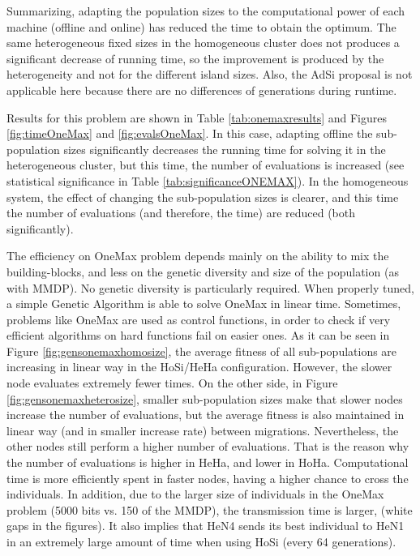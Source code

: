 \documentclass[final,1p,times]{elsarticle}
\begin{document}
Summarizing, adapting the population sizes to the
  computational power of each machine (offline and online) has reduced
  the time to obtain the optimum. The same heterogeneous fixed sizes
  in the homogeneous cluster does not produces a significant decrease
  of running time, so the improvement is produced by the heterogeneity
  and not for the different island sizes. Also, the AdSi proposal is
  not applicable here because there are no differences of generations
  during runtime.





Results for this problem are shown in Table \ref{tab:onemaxresults} and Figures  \ref{fig:timeOneMax} and \ref{fig:evalsOneMax}. In this case, adapting offline the sub-population sizes significantly decreases  the running time for solving it in the heterogeneous cluster, but this time, the number of evaluations is increased (see statistical significance in Table \ref{tab:significanceONEMAX}). In the homogeneous system, the effect of changing the sub-population sizes is clearer, and this time the number of evaluations (and therefore, the time) are reduced (both significantly). 

The efficiency on OneMax problem depends mainly on the ability to mix
the building-blocks, and less on the genetic diversity and size of the
population (as with MMDP). No genetic diversity is particularly
required. When properly tuned, a simple Genetic Algorithm is able to
solve OneMax in linear time. Sometimes, problems like OneMax are used
as control functions, in order to check if very efficient algorithms
on hard functions fail on easier ones. As it can be seen in Figure
\ref{fig:gensonemaxhomosize}, the average fitness of all sub-populations
are increasing in linear way in the HoSi/HeHa configuration. However,
the slower node evaluates extremely fewer times.  On the other
side, in Figure \ref{fig:gensonemaxheterosize}, smaller sub-population
sizes make that slower nodes increase the number of evaluations,
but the average fitness is also maintained in linear way (and in
smaller increase rate) between migrations. Nevertheless, the other
nodes still perform a higher number of evaluations. That is the
reason why the number of evaluations is higher in HeHa, and lower in
HoHa. Computational time is more efficiently spent in faster nodes,
having a higher chance to cross the individuals. In addition, due to
the larger size of  individuals in the OneMax problem (5000 bits
vs. 150 of the MMDP), the transmission time is larger, (white gaps in the
figures). It also implies that HeN4 sends its best individual to
HeN1 in an extremely large amount of time when using HoSi (every 64
generations). 
\end{document}
